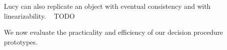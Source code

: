 Lucy can also replicate an object with eventual consistency and with
linearizability. ~\cite{whittaker2018interactive} TODO


We now evaluate the practicality and efficiency of our decision procedure
prototypes.



